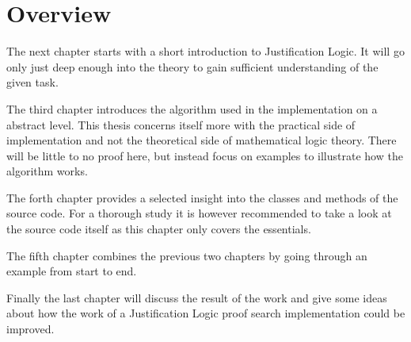 \section{Overview}
The next chapter starts with a short introduction to Justification Logic. It will go only just deep enough into the theory to gain sufficient understanding of the given task.
\par
The third chapter introduces the algorithm used in the implementation on a abstract level. This thesis concerns itself more with the practical side of implementation and not the theoretical side of mathematical logic theory. There will be little to no proof here, but instead focus on examples to illustrate how the algorithm works.
\par
The forth chapter provides a selected insight into the classes and methods of the source code. For a thorough study it is however recommended to take a look at the source code itself as this chapter only covers the essentials. 
\par
The fifth chapter combines the previous two chapters by going through an example from start to end.
\par
{} Finally the last chapter will discuss the result of the work and give some ideas about how the work of a Justification Logic proof search implementation could be improved.